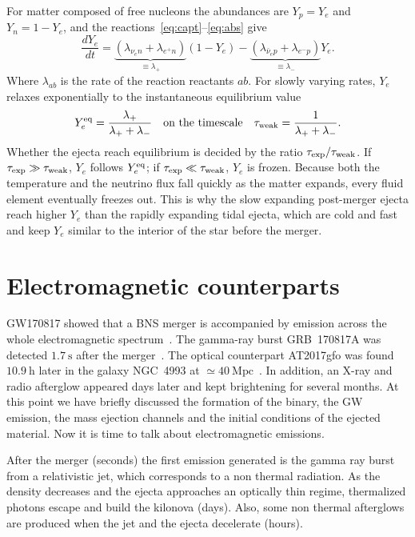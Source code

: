 For matter composed of free nucleons the abundances are $Y_p=Y_e$ and $Y_n=1-Y_e$, and the reactions~\ref{eq:capt}--\ref{eq:abs} give
\begin{equation}\label{eq:dYedt}
  \frac{dY_e}{dt} = \underbrace{\left(\lambda_{\nu_en}+\lambda_{e^+n}\right)}_{\equiv\lambda_+}(1-Y_e) - \underbrace{\left(\lambda_{\bar\nu_ep}+\lambda_{e^-p}\right)}_{\equiv\lambda_-}Y_e .
\end{equation}
Where $\lambda_{ab}$ is the rate of the reaction reactants $ab$. 
For slowly varying rates, $Y_e$ relaxes exponentially to the instantaneous equilibrium value
\begin{equation}\label{eq:Yeeq}
  Y_e^{\rm eq}=\frac{\lambda_+}{\lambda_++\lambda_-}
  \quad\text{on the timescale}\quad
  \tau_{\rm weak}=\frac{1}{\lambda_++\lambda_-}.
\end{equation}
Whether the ejecta reach equilibrium is decided by the ratio $\tau_{\rm exp}/\tau_{\rm weak}$.
If $\tau_{\rm exp}\gg\tau_{\rm weak}$, $Y_e$ follows $Y_e^{\rm eq}$; if $\tau_{\rm exp}\ll\tau_{\rm weak}$, $Y_e$ is frozen.
Because both the temperature and the neutrino flux fall quickly as the matter expands, every fluid element eventually freezes out.
This is why the slow expanding post-merger ejecta reach higher $Y_e$ than the rapidly expanding tidal ejecta, which are cold and fast and keep $Y_e$ similar to the interior of the star before the merger.

\section{Electromagnetic counterparts}

GW170817 showed that a BNS merger is accompanied by emission across the whole electromagnetic spectrum~\cite{abbott_multi-messenger_2017}.
The gamma-ray burst GRB~170817A was detected $1.7~\mathrm{s}$ after the merger~\cite{abbott_gravitational_2017}.
The optical counterpart AT2017gfo was found $10.9~\mathrm{h}$ later in the galaxy NGC~4993 at $\simeq40~\mathrm{Mpc}$~\cite{coulter_swope_2017}.
In addition, an X-ray and radio afterglow appeared days later and kept brightening for several months.
At this point we have briefly discussed the formation of the binary, the GW emission, the mass ejection channels and the initial conditions of the ejected material. 
Now it is time to talk about electromagnetic emissions.

After the merger (seconds) the first emission generated is the gamma ray burst from a relativistic jet, which corresponds to a non thermal radiation.
As the density decreases and the ejecta approaches an optically thin regime, thermalized photons escape and build the kilonova (days).
Also, some non thermal afterglows are produced when the jet and the ejecta decelerate (hours).


